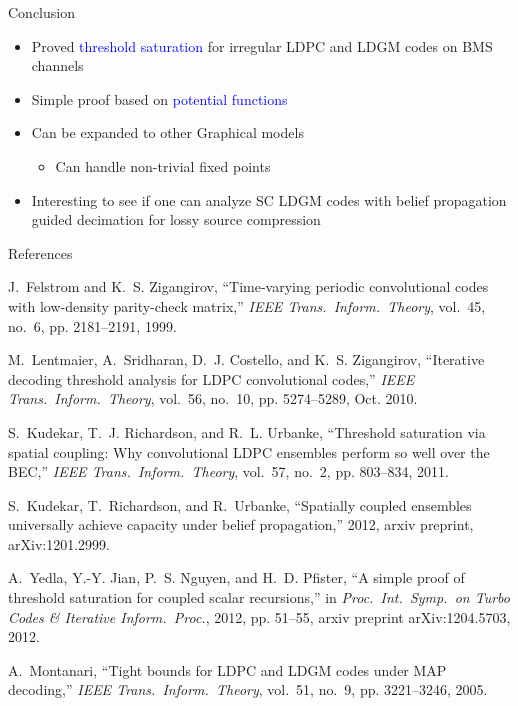 \documentclass{beamer}
\newlength{\threecolwid}
\begin{document}
\begin{columns}[t]
\begin{column}{\threecolwid}
\begin{block}{Conclusion}
  \begin{itemize}
  \item Proved \textcolor{blue}{threshold saturation} for irregular LDPC and LDGM codes on BMS channels
    \vspace{0.5cm}
  \item Simple proof based on \textcolor{blue}{potential functions}
    \vspace{0.5cm}
  \item Can be expanded to other Graphical models
    \begin{itemize}
    \item Can handle \alert{non-trivial fixed points}
    \end{itemize}
  \item Interesting to see if one can analyze SC LDGM codes with belief propagation guided decimation for lossy source compression 
  \end{itemize}
\end{block}

\begin{block}{References}

\begin{thebibliography}{10}
  J.~Felstrom and K.~S. Zigangirov, ``Time-varying periodic convolutional codes
  with low-density parity-check matrix,'' \emph{IEEE Trans.\ Inform.\ Theory},
  vol.~45, no.~6, pp. 2181--2191, 1999.
  
M.~Lentmaier, A.~Sridharan, D.~J. Costello, and K.~S. Zigangirov, ``Iterative
  decoding threshold analysis for {LDPC} convolutional codes,'' \emph{IEEE
  Trans.\ Inform.\ Theory}, vol.~56, no.~10, pp. 5274--5289, Oct. 2010.

S.~Kudekar, T.~J. Richardson, and R.~L. Urbanke, ``Threshold saturation via
  spatial coupling: {W}hy convolutional {LDPC} ensembles perform so well over
  the {BEC},'' \emph{IEEE Trans.\ Inform.\ Theory}, vol.~57, no.~2, pp.
  803--834, 2011.

S.~Kudekar, T.~Richardson, and R.~Urbanke, ``Spatially coupled ensembles
  universally achieve capacity under belief propagation,'' 2012, arxiv preprint,
  arXiv:1201.2999.

A.~Yedla, Y.-Y. Jian, P.~S. Nguyen, and H.~D. Pfister, ``A simple proof of
  threshold saturation for coupled scalar recursions,'' in \emph{Proc.\ Int.\
  Symp.\ on Turbo Codes \& Iterative Inform.\ Proc.}, 2012, pp. 51--55, arxiv
  preprint arXiv:1204.5703, 2012.

A.~Montanari, ``Tight bounds for {LDPC} and {LDGM} codes under {MAP}
  decoding,'' \emph{IEEE Trans.\ Inform.\ Theory}, vol.~51, no.~9, pp.
  3221--3246, 2005.

\end{thebibliography}

\end{block}

\end{column}
\end{columns}
\end{document}

